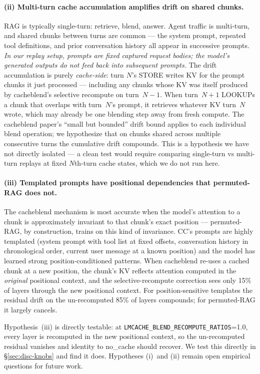 \paragraph{(ii) Multi-turn cache accumulation amplifies drift on shared
chunks.} RAG is typically single-turn: retrieve, blend, answer. Agent
traffic is multi-turn, and shared chunks between turns are common ---
the system prompt, repeated tool definitions, and prior conversation
history all appear in successive prompts. \emph{In our replay setup,
prompts are fixed captured request bodies; the model's generated
outputs do not feed back into subsequent prompts.} The drift
accumulation is purely \emph{cache-side}: turn $N$'s STORE writes KV
for the prompt chunks it just processed --- including any chunks
whose KV was itself produced by cacheblend's selective recompute on
turn~$N{-}1$. When turn~$N{+}1$ LOOKUPs a chunk that overlaps with
turn~$N$'s prompt, it retrieves whatever KV turn~$N$ wrote, which
may already be one blending step away from fresh compute. The
cacheblend paper's ``small but bounded'' drift bound applies to each
individual blend operation; we hypothesize that on chunks shared
across multiple consecutive turns the cumulative drift compounds.
This is a hypothesis we have not directly isolated --- a clean test
would require comparing single-turn vs multi-turn replays at fixed
$N$th-turn cache states, which we do not run here.

\paragraph{(iii) Templated prompts have positional dependencies that
permuted-RAG does not.} The cacheblend mechanism is most accurate when
the model's attention to a chunk is approximately invariant to that
chunk's exact position --- permuted-RAG, by construction, trains on
this kind of invariance. CC's prompts are highly templated (system
prompt with tool list at fixed offsets, conversation history in
chronological order, current user message at a known position) and the
model has learned strong position-conditioned patterns. When
cacheblend re-uses a cached chunk at a new position, the chunk's KV
reflects attention computed in the \emph{original} positional context,
and the selective-recompute correction sees only 15\% of layers
through the new positional context. For position-sensitive templates
the residual drift on the un-recomputed 85\% of layers compounds; for
permuted-RAG it largely cancels.

Hypothesis~(iii) is directly testable: at
\texttt{LMCACHE\_BLEND\_\allowbreak{}RECOMPUTE\_RATIOS}=1.0, every layer
is recomputed in the new positional context, so the un-recomputed
residual vanishes and identity to no\_cache should recover. We test
this directly in \S\ref{sec:disc-knobs} and find it does. Hypotheses
(i)~and (ii) remain open empirical questions for future work.

